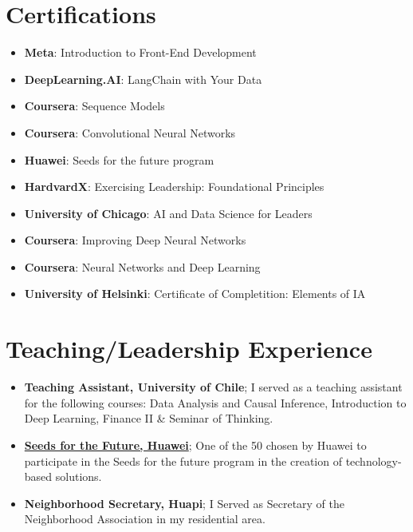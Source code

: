 \documentclass[letterpaper,11pt]{article}
\newcommand{\resumeItem}[2]{
  \item\small{
    \textbf{#1}{#2 \vspace{-2pt}}
  }
}
\newcommand{\resumeSubItem}[2]{\resumeItem{#1}{#2}\vspace{-4pt}}
\newcommand{\resumeSubItemcol}[2]{\resumeItem{#1}{#2}\vspace{-8pt}}
\newcommand{\resumeSubHeadingListStart}{\begin{itemize}[leftmargin=*]}
\newcommand{\resumeSubHeadingListEnd}{\end{itemize}}
\begin{document}
\section{Certifications}
\vspace{-15pt}
  \begin{multicols}{2}
    \resumeSubHeadingListStart
    \resumeSubItemcol{Meta}{: Introduction to Front-End Development}
    \resumeSubItemcol{DeepLearning.AI}{: LangChain with Your Data}
    \resumeSubItemcol{Coursera}{: Sequence Models}
    \resumeSubItemcol{Coursera}{: Convolutional Neural Networks}
    \resumeSubItemcol{Huawei}{: Seeds for the future program}
    \resumeSubItemcol{HardvardX}{: Exercising Leadership: Foundational Principles}
    \resumeSubItemcol{University of Chicago}{: AI and Data Science for Leaders}
    \resumeSubItemcol{Coursera}{: Improving Deep Neural Networks}
    \resumeSubItemcol{Coursera}{: Neural Networks and Deep Learning}
    \resumeSubItemcol{University of Helsinki}{: Certificate of Completition: Elements of IA}
  \resumeSubHeadingListEnd
  \end{multicols}
\section{Teaching/Leadership Experience}
 \resumeSubHeadingListStart
  \resumeSubItem
    {Teaching Assistant, University of Chile}
    {; I served as a teaching assistant for the following courses: Data Analysis and Causal Inference, Introduction to Deep Learning, Finance II \& Seminar of Thinking.}
  \resumeSubItem
    {\href{https://ingenieria.uchile.cl/noticias/188882/estudiantes-fcfm-destacaron-en-5ta-version-del-programa-huawei}{Seeds for the Future, Huawei}}
    {; One of the 50 chosen by Huawei to participate in the Seeds for the future program in the creation of technology-based solutions.}
  \resumeSubItem
    {Neighborhood Secretary, Huapi}
    {; I Served as Secretary of the Neighborhood Association in my residential area.}
  \resumeSubHeadingListEnd
\end{document}
